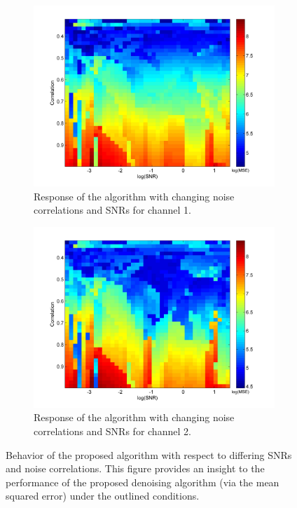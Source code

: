 \documentclass[onecolumn, groupedaddress, 10pt]{revtex4-1}
\begin{document}
\begin{figure}[H]
	\centering
	\begin{subfigure}{.5\textwidth}
  		\centering
  		\includegraphics[scale=0.05]{denoise_4.jpg}
  		\caption{\label{fig:denoise_4} Response of the algorithm with changing noise correlations and SNRs for channel 1.}
	\end{subfigure}%
	\begin{subfigure}{.5\textwidth}
  		\centering
  		\includegraphics[scale=0.05]{denoise_5.jpg}
  		\caption{\label{fig:denoise_5} Response of the algorithm with changing noise correlations and SNRs for channel 2.}
	\end{subfigure}
	\caption{Behavior of the proposed algorithm with respect to differing SNRs and noise correlations. This figure provides an insight to the performance of the proposed denoising algorithm (via the mean squared error) under the outlined conditions.}
\end{figure}
\end{document}
